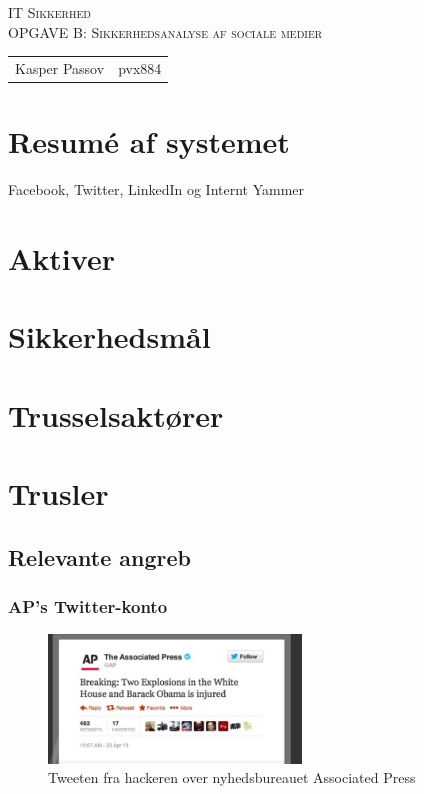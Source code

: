 \documentclass{article}
\begin{document}
\begin{titlepage}
\begin{center}
\textsc{\Large IT Sikkerhed}\\[0.5cm]
\textsc{OPGAVE B: Sikkerhedsanalyse af sociale medier}\\[0.5cm]
\vspace{2 cm}
\begin{tabular}{ll}
Kasper Passov & pvx884\\
\end{tabular}
\end{center}
\vspace{5 cm}
\newpage
\tableofcontents
\end{titlepage}

\section{Resumé af systemet}
Facebook, Twitter, LinkedIn og Internt Yammer
\section{Aktiver}

\section{Sikkerhedsmål}

\section{Trusselsaktører}

\section{Trusler}

\subsection{Relevante angreb}
\newpage
\subsubsection{AP's Twitter-konto}

\begin{figure}
  \begin{center}
    \includegraphics[width=0.6\textwidth]{../Pictures/APTweet.jpg}
  \end{center}
  \caption{Tweeten fra hackeren over nyhedsbureauet Associated Press \cite{APTweetSource}}
\end{figure}
\end{document}
